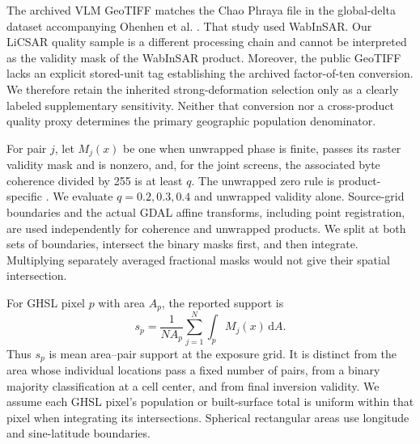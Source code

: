 \documentclass[pdflatex,lineno,sn-nature]{sn-jnl}
\begin{document}
The archived VLM GeoTIFF matches the Chao Phraya file in the global-delta dataset accompanying Ohenhen et al. \citep{ohenhen2026deltas,ohenhen2025deltadata}. That study used WabInSAR. Our LiCSAR quality sample is a different processing chain and cannot be interpreted as the validity mask of the WabInSAR product. Moreover, the public GeoTIFF lacks an explicit stored-unit tag establishing the archived factor-of-ten conversion. We therefore retain the inherited strong-deformation selection only as a clearly labeled supplementary sensitivity. Neither that conversion nor a cross-product quality proxy determines the primary geographic population denominator.

For pair $j$, let $M_j(x)$ be one when unwrapped phase is finite, passes its raster validity mask and is nonzero, and, for the joint screens, the associated byte coherence divided by 255 is at least $q$. The unwrapped zero rule is product-specific \citep{licsarproducts}. We evaluate $q=0.2,0.3,0.4$ and unwrapped validity alone. Source-grid boundaries and the actual GDAL affine transforms, including point registration, are used independently for coherence and unwrapped products. We split at both sets of boundaries, intersect the binary masks first, and then integrate. Multiplying separately averaged fractional masks would not give their spatial intersection.

For GHSL pixel $p$ with area $A_p$, the reported support is
\begin{equation}
s_p=\frac{1}{N A_p}\sum_{j=1}^{N}\int_p M_j(x)\,\mathrm{d}A.
\label{eq:support}
\end{equation}
Thus $s_p$ is mean area--pair support at the exposure grid. It is distinct from the area whose individual locations pass a fixed number of pairs, from a binary majority classification at a cell center, and from final inversion validity. We assume each GHSL pixel's population or built-surface total is uniform within that pixel when integrating its intersections. Spherical rectangular areas use longitude and sine-latitude boundaries.
\end{document}
